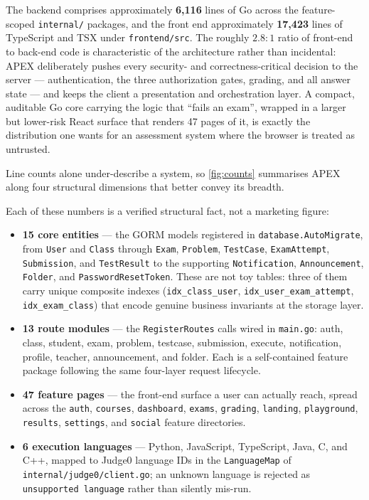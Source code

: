 

The backend comprises approximately \textbf{6{,}116} lines of Go across the
feature-scoped \texttt{internal/} packages, and the front end approximately
\textbf{17{,}423} lines of TypeScript and TSX under \texttt{frontend/src}. The
roughly $2.8\!:\!1$ ratio of front-end to back-end code is characteristic of the
architecture rather than incidental: APEX deliberately pushes every security- and
correctness-critical decision to the server --- authentication, the three
authorization gates, grading, and all answer state --- and keeps the client a
presentation and orchestration layer. A compact, auditable Go core carrying the
logic that ``fails an exam'', wrapped in a larger but lower-risk React surface that
renders 47 pages of it, is exactly the distribution one wants for an assessment
system where the browser is treated as untrusted.

Line counts alone under-describe a system, so \cref{fig:counts} summarises APEX
along four structural dimensions that better convey its breadth.



Each of these numbers is a verified structural fact, not a marketing figure:

\begin{itemize}[leftmargin=1.4em]
  \item \textbf{15 core entities} --- the GORM models registered in
        \texttt{database.AutoMigrate}, from \texttt{User} and \texttt{Class} through
        \texttt{Exam}, \texttt{Problem}, \texttt{TestCase}, \texttt{ExamAttempt},
        \texttt{Submission}, and \texttt{TestResult} to the supporting
        \texttt{Notification}, \texttt{Announcement}, \texttt{Folder}, and
        \texttt{PasswordResetToken}. These are not toy tables: three of them carry
        unique composite indexes (\texttt{idx\_class\_user},
        \texttt{idx\_user\_exam\_attempt}, \texttt{idx\_exam\_class}) that encode
        genuine business invariants at the storage layer.
  \item \textbf{13 route modules} --- the \texttt{RegisterRoutes} calls wired in
        \texttt{main.go}: auth, class, student, exam, problem, testcase, submission,
        execute, notification, profile, teacher, announcement, and folder. Each is a
        self-contained feature package following the same four-layer request
        lifecycle.
  \item \textbf{47 feature pages} --- the front-end surface a user can actually
        reach, spread across the \texttt{auth}, \texttt{courses}, \texttt{dashboard},
        \texttt{exams}, \texttt{grading}, \texttt{landing}, \texttt{playground},
        \texttt{results}, \texttt{settings}, and \texttt{social} feature directories.
  \item \textbf{6 execution languages} --- Python, JavaScript, TypeScript, Java, C,
        and C++, mapped to Judge0 language IDs in the \texttt{LanguageMap} of
        \texttt{internal/judge0/client.go}; an unknown language is rejected as
        \texttt{unsupported language} rather than silently mis-run.
\end{itemize}

